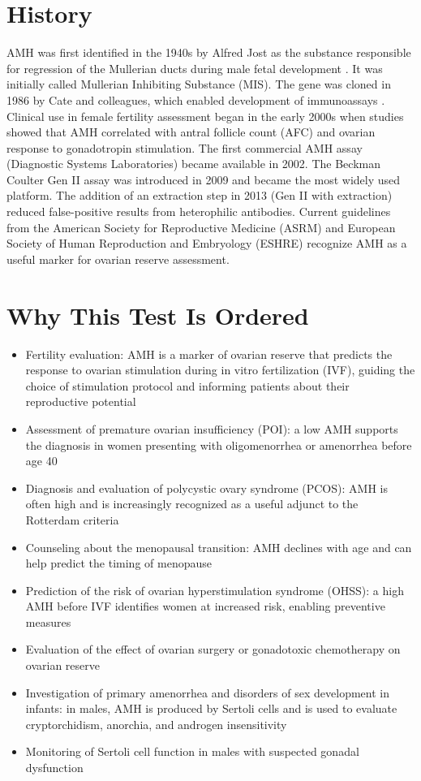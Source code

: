 \section*{History}
AMH was first identified in the 1940s by Alfred Jost as the substance responsible for regression of the Mullerian ducts during male fetal development \cite{jost1947recherches}. It was initially called Mullerian Inhibiting Substance (MIS). The gene was cloned in 1986 by Cate and colleagues, which enabled development of immunoassays \cite{cate1986isolation}. Clinical use in female fertility assessment began in the early 2000s when studies showed that AMH correlated with antral follicle count (AFC) and ovarian response to gonadotropin stimulation. The first commercial AMH assay (Diagnostic Systems Laboratories) became available in 2002. The Beckman Coulter Gen II assay was introduced in 2009 and became the most widely used platform. The addition of an extraction step in 2013 (Gen II with extraction) reduced false-positive results from heterophilic antibodies. Current guidelines from the American Society for Reproductive Medicine (ASRM) and European Society of Human Reproduction and Embryology (ESHRE) recognize AMH as a useful marker for ovarian reserve assessment.

\section*{Why This Test Is Ordered}
\begin{itemize}
  \item Fertility evaluation: AMH is a marker of ovarian reserve that predicts the response to ovarian stimulation during in vitro fertilization (IVF), guiding the choice of stimulation protocol and informing patients about their reproductive potential
  \item Assessment of premature ovarian insufficiency (POI): a low AMH supports the diagnosis in women presenting with oligomenorrhea or amenorrhea before age 40
  \item Diagnosis and evaluation of polycystic ovary syndrome (PCOS): AMH is often high and is increasingly recognized as a useful adjunct to the Rotterdam criteria
  \item Counseling about the menopausal transition: AMH declines with age and can help predict the timing of menopause
  \item Prediction of the risk of ovarian hyperstimulation syndrome (OHSS): a high AMH before IVF identifies women at increased risk, enabling preventive measures
  \item Evaluation of the effect of ovarian surgery or gonadotoxic chemotherapy on ovarian reserve
  \item Investigation of primary amenorrhea and disorders of sex development in infants: in males, AMH is produced by Sertoli cells and is used to evaluate cryptorchidism, anorchia, and androgen insensitivity
  \item Monitoring of Sertoli cell function in males with suspected gonadal dysfunction
\end{itemize}

